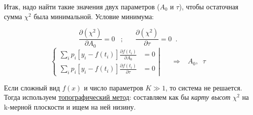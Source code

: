 \documentclass[12pt,epsfig,color,russian]{article}
\begin{document}
Итак, надо найти такие значения двух параметров ($A_0$ и $\tau$), чтобы остаточная сумма $\chi^2$ была ми\-ни\-мальной. Условие минимума:

 \begin{displaymath}
\frac{\partial(\chi^2)}{\partial A_0}=0\;\;\;;\;\;\;\;\;\;
\frac{\partial(\chi^2)}{\partial \tau}=0\;\;.
 \end{displaymath}
 \begin{displaymath}
 \left\{
 \begin{array}{cc}
 \sum_i p_i \left[y_i-f(t_i)\right]\frac{\partial f(t_i)}{\partial A_0} &= 0\\[2mm]
 \sum_i p_i \left[y_i-f(t_i)\right]\frac{\partial f(t_i)}{\partial \tau} &= 0
 \end{array}
 \right|\;\;\;\;\;\;\Rightarrow\;\;\;A_0,\;\;\tau
 \end{displaymath}

Если сложный вид $f(x)$ и число параметров $K\gg 1$, то система не решается. Тогда используем \underline{топографический метод}: составляем как бы {\sl карту высот} $\chi^2$ на k-мерной плоскости и ищем на ней низину.
\end{document}
